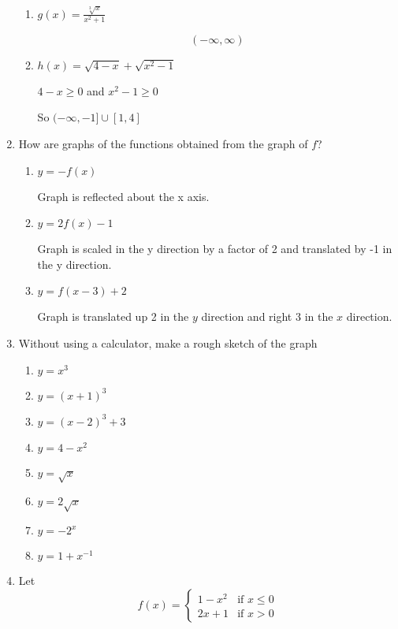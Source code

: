 \documentclass{article}
\begin{document}
\begin{enumerate}
\begin{enumerate}
		\item $g(x) = \frac{\sqrt[3]{x}}{x^2 + 1}$

			$$(-\infty, \infty)$$

		\item $h(x) = \sqrt{4 - x} + \sqrt{x^2 - 1}$

		$4 - x \geq 0$ and $x^2 - 1 \geq 0$

		So $(-\infty, -1] \cup [1, 4]$
	\end{enumerate}

	\item How are graphs of the functions obtained from the graph of $f$?
	\begin{enumerate}
		\item $y = -f(x)$

			Graph is reflected about the x axis.

		\item $y = 2f(x) - 1$

			Graph is scaled in the y direction by a factor of 2 and translated by -1 in the y direction.

		\item $y = f(x - 3) + 2$

			Graph is translated up 2 in the $y$ direction and right 3 in the $x$ direction.
	\end{enumerate}

	\item Without using a calculator, make a rough sketch of the graph
	\begin{enumerate}
		\item $y = x^3$

		\item $y = (x + 1)^{3}$

		\item $y = (x - 2)^{3} + 3$

		\item $ y = 4 - x^{2} $

		\item $y = \sqrt{x}$

		\item $y = 2\sqrt{x}$

		\item $ y = -2^{x}$

		\item $ y = 1 + x^{-1} $
	\end{enumerate}

	\item Let 
 \begin{displaymath}
   f(x) = \left\{
     \begin{array}{lr}
       1 - x^{2} & \text{if } x \leq 0\\
       2x + 1 &  \text{if } x > 0 
     \end{array}
   \right.
\end{displaymath} 


\end{enumerate}
\end{document}
